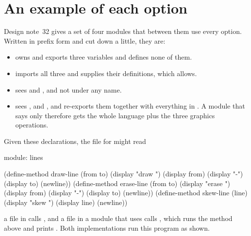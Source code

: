 \section{An example of each option}\label{sec:modules-example-options}

Design note~32 gives a set of four modules that between them use every
option. Written in prefix form and cut down a little, they are:


\begin{itemize}
\item {} owns and exports three variables and defines none
  of them.
\item {} imports all three and supplies their definitions,
  which  allows.
\item {} sees  and ,
  and not  under any name.
\item {} sees ,  and
  , and re-exports them together with everything in
  . A module that says only  therefore gets the
  whole language plus the three graphics operations.
\end{itemize}

\noindent
Given these declarations, the file for  might read

\begin{dylan}
module: lines

(define-method draw-line (from to)
  (display "draw ") (display from) (display "-") (display to) (newline))
(define-method erase-line (from to)
  (display "erase ") (display from) (display "-") (display to) (newline))
(define-method skew-line (line)
  (display "skew ") (display line) (newline))
\end{dylan}

\noindent
a file in  calls , and a file in a
module that uses  calls , which runs the
 method above and prints . Both
implementations run this program as shown.

